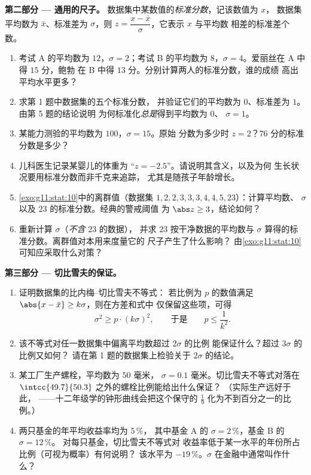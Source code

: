\begin{problem}
\medskip
\noindent\textbf{第二部分 --- 通用的尺子。}
数据集中某数值的\emph{标准分数}，记该数值为 $x$，
数据集平均数为 $\bar x$、标准差为 $\sigma$，则
$z = \dfrac{x - \bar x}{\sigma}$，它表示 $x$ 与平均数
相差的标准差个数。
\begin{enumerate}[resume]
  \item 考试 A 的平均数为 $12$，$\sigma = 2$；考试 B 的平均数为
        $8$，$\sigma = 4$。爱丽丝在 A 中得 $15$ 分，鲍勃
        在 B 中得 $13$ 分。分别计算两人的标准分数，谁的成绩
        高出平均水平更多？
  \item 求第 1 题中数据集的五个标准分数，
        并验证它们的平均数为 $0$、标准差为
        $1$。由第 5 题的结论说明
        为何标准化\emph{总是}得到平均数为 $0$、
        $\sigma = 1$。
  \item 某能力测验的平均数为 $100$，$\sigma = 15$。原始
        分数为多少时 $z = 2$？$76$ 分的标准分数是多少？
  \item 儿科医生记录某婴儿的体重为
        “$z = -2.5$”。请说明其含义，以及为何
        生长状况要用标准分数而非千克来追踪，
        尤其是随孩子年龄增长。
  \item \cref{exo:g11:stat:10}中的离群值（数据集
        $1, 2, 2, 3, 3, 3, 4, 4, 5, 23$）：计算平均数、
        $\sigma$ 以及 $23$ 的标准分数。经典的警戒阈值
        为 $\abs z \geq 3$，结论如何？
  \item 重新计算 $\sigma$（\emph{不含} $23$ 的数据），
        并求 $23$ 按干净数据的平均数与
        $\sigma$ 算得的标准分数。离群值对本用来度量它的
        尺子产生了什么影响？
        由\cref{exo:g11:stat:10}可知应采取什么对策？
\end{enumerate}

\medskip
\noindent\textbf{第三部分 --- 切比雪夫的保证。}
\begin{enumerate}[resume]
  \item 证明数据集的比内梅–切比雪夫不等式：
        若比例为 $p$ 的数值满足
        $\abs{x - \bar x} \geq k\sigma$，则在方差和式中
        仅保留这些项，可得
        \[
        \sigma^2 \geq p \cdot (k\sigma)^2,
        \qquad\text{于是}\qquad
        p \leq \frac{1}{k^2} .
        \]
  \item 该不等式对任一数据集中偏离平均数超过 $2\sigma$ 的比例
        能保证什么？超过 $3\sigma$ 的比例又如何？
        请在第 1 题的数据集上检验关于
        $2\sigma$ 的结论。
  \item 某工厂生产螺栓，平均数为 $50$ 毫米，
        $\sigma = 0.1$ 毫米。切比雪夫不等式对落在
        $\intcc{49.7}{50.3}$ 之外的螺栓比例能给出什么保证？
        （实际生产远好于此，
        ——十二年级学的钟形曲线会把这个保守的
        $\frac19$ 化为不到百分之一的比例。）
  \item 两只基金的年平均收益率均为 $5\,\%$，
        其中基金 A 的 $\sigma = 2\,\%$，基金 B 的 $\sigma = 12\,\%$。
        对每只基金，切比雪夫不等式对
        收益率低于某一水平的年份所占比例（可视为概率）有何说明？
        该水平为 $-19\,\%$。$\sigma$ 在金融中通常叫作什么？
\end{enumerate}


\end{problem}
